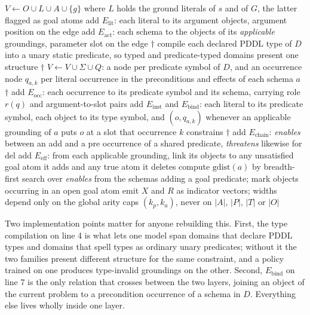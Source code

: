 \documentclass[letterpaper]{article}
\newcommand{\gadar}{GADAR}
\begin{document}
\begin{algorithm}[t]
\caption{Construction of the \gadar{} graph for $(s, G, D)$}
\label{alg:graph}
\begin{algorithmic}[1]
\STATE $V \leftarrow O \cup L \cup A \cup \{g\}$ where $L$ holds the ground
  literals of $s$ and of $G$, the latter flagged as goal atoms
\STATE add $E_{\mathrm{lit}}$: each literal to its argument objects, argument
  position on the edge
\STATE add $E_{\mathrm{act}}$: each schema to the objects of its
  \emph{applicable} groundings, parameter slot on the edge
\STATE $\dagger$ compile each declared PDDL type of $D$ into a unary static
  predicate, so typed and predicate-typed domains present one structure
\STATE $\dagger$ $V \leftarrow V \cup \Sigma \cup Q$: a node per predicate
  symbol of $D$, and an occurrence node $q_{a,k}$ per literal occurrence in
  the preconditions and effects of each schema $a$
\STATE $\dagger$ add $E_{\mathrm{occ}}$: each occurrence to its predicate
  symbol and its schema, carrying role $r(q)$ and argument-to-slot pairs
\STATE add $E_{\mathrm{inst}}$ and $E_{\mathrm{bind}}$: each literal to its
  predicate symbol, each object to its type symbol, and $(o, q_{a,k})$
  whenever an applicable grounding of $a$ puts $o$ at a slot that occurrence
  $k$ constrains
\STATE $\dagger$ add $E_{\mathrm{chain}}$: \textit{enables} between an add and
  a pre occurrence of a shared predicate, \textit{threatens} likewise for del
\STATE add $E_{\mathrm{eff}}$: from each applicable grounding, link its
  objects to any unsatisfied goal atom it adds and any true atom it deletes
\STATE compute $\mathrm{gdist}(a)$ by breadth-first search over
  \textit{enables} from the schemas adding a goal predicate; mark objects
  occurring in an open goal atom
\STATE emit $X$ and $R$ as indicator vectors; widths depend only on the global
  arity caps $(k_p, k_a)$, never on $|A|$, $|P|$, $|T|$ or $|O|$
\end{algorithmic}
\end{algorithm}

Two implementation points matter for anyone rebuilding this. First, the type
compilation on line 4 is what lets one model span domains that declare PDDL
types and domains that spell types as ordinary unary predicates; without it
the two families present different structure for the same constraint, and a
policy trained on one produces type-invalid groundings on the other. Second,
$E_{\mathrm{bind}}$ on line 7 is the only relation that crosses between the
two layers, joining an object of the current problem to a precondition
occurrence of a schema in $D$. Everything else lives wholly inside one layer.
\end{document}
